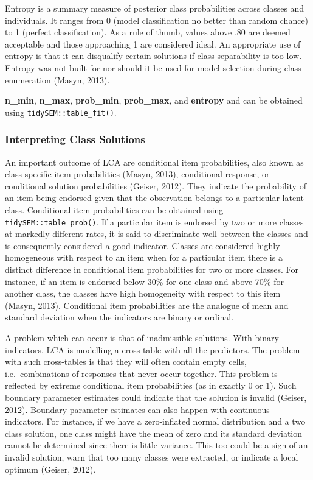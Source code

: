 \documentclass[
  ,man,floatsintext]{apa6}
\begin{document}
Entropy is a summary measure of posterior class probabilities across
classes and individuals. It ranges from 0 (model classification no
better than random chance) to 1 (perfect classification). As a rule of
thumb, values above .80 are deemed acceptable and those approaching 1
are considered ideal. An appropriate use of entropy is that it can
disqualify certain solutions if class separability is too low. Entropy
was not built for nor should it be used for model selection during class
enumeration (Masyn, 2013).

\textbf{n\_min}, \textbf{n\_max}, \textbf{prob\_min}, \textbf{prob\_max}, and \textbf{entropy} and
can be obtained using \texttt{tidySEM::table\_fit()}.

\hypertarget{interpreting-class-solutions}{%
\subsubsection{Interpreting Class Solutions}\label{interpreting-class-solutions}}

An important outcome of LCA are conditional item probabilities, also
known as class-specific item probabilities (Masyn, 2013),
conditional response, or conditional solution probabilities
(Geiser, 2012). They indicate the probability of an item being
endorsed given that the observation belongs to a particular latent
class. Conditional item probabilities can be obtained using
\texttt{tidySEM::table\_prob()}. If a particular item is endorsed by two or more
classes at markedly different rates, it is said to discriminate well
between the classes and is consequently considered a good indicator.
Classes are considered highly homogeneous with respect to an item when
for a particular item there is a distinct difference in conditional item
probabilities for two or more classes. For instance, if an item is
endorsed below 30\% for one class and above 70\% for another class, the
classes have high homogeneity with respect to this item
(Masyn, 2013). Conditional item probabilities are the analogue of
mean and standard deviation when the indicators are binary or ordinal.

A problem which can occur is that of inadmissible solutions. With binary
indicators, LCA is modelling a cross-table with all the predictors. The
problem with such cross-tables is that they will often contain empty
cells, i.e.~combinations of responses that never occur together. This
problem is reflected by extreme conditional item probabilities (as in
exactly 0 or 1). Such boundary parameter estimates could indicate that
the solution is invalid (Geiser, 2012). Boundary parameter
estimates can also happen with continuous indicators. For instance, if
we have a zero-inflated normal distribution and a two class solution,
one class might have the mean of zero and its standard deviation cannot
be determined since there is little variance. This too could be a sign
of an invalid solution, warn that too many classes were extracted, or
indicate a local optimum (Geiser, 2012).
\end{document}
